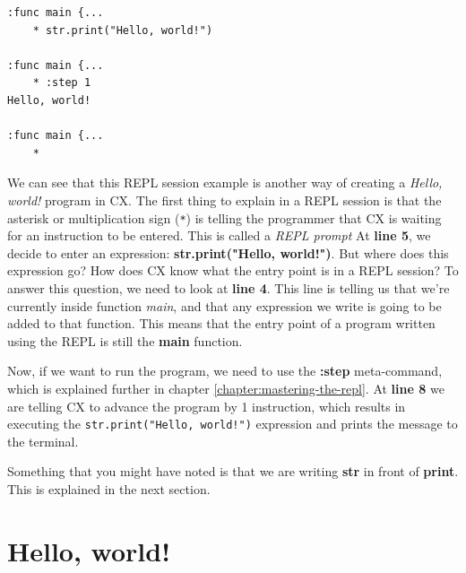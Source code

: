 \documentclass[11pt,fleqn,openany]{book} %
\begin{document}
\begin{lstlisting}[caption={REPL session example},captionpos=b,label={listing:repl-example-1}]
:func main {...
	* str.print("Hello, world!")

:func main {...
	* :step 1
Hello, world!

:func main {...
	* 
\end{lstlisting}

We can see that this REPL session example is another way of creating a \textit{Hello, world!} program in CX. The first thing to explain in a REPL session is that the asterisk or multiplication sign (\lstinline{*}) is telling the programmer that CX is waiting for an instruction to be entered. This is called a \textit{REPL prompt} At \textbf{line 5}, we decide to enter an expression: \textbf{str.print("Hello, world!")}. But where does this expression go? How does CX know what the entry point is in a REPL session? To answer this question, we need to look at \textbf{line 4}. This line is telling us that we're currently inside function \emph{main}, and that any expression we write is going to be added to that function. This means that the entry point of a program written using the REPL is still the \textbf{main} function.

Now, if we want to run the program, we need to use the \textbf{:step} meta-command, which is explained further in chapter \ref{chapter:mastering-the-repl}. At \textbf{line 8} we are telling CX to advance the program by 1 instruction, which results in executing the \lstinline{str.print("Hello, world!")} expression and prints the message to the terminal.

Something that you might have noted is that we are writing \textbf{str} in front of \textbf{print}. This is explained in the next section.


\chapter{Hello, world!}
\label{chapter:hello-world}

\end{document}
